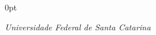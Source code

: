 \documentclass[a4paper]{article}
\begin{document}
\begin{adjustwidth}{\parindent}{0pt}
\begin{minipage}[t]{0.65\textwidth}
\begin{minipage}[t]{0.8\textwidth}
{  \large{\textit{Universidade Federal de Santa Catarina}} \\
}
\end{minipage} \\ \\

\end{minipage}
\end{adjustwidth}
\end{document}
